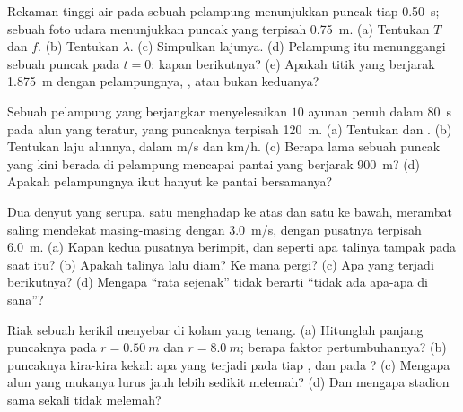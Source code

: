 \begin{exercise}[$\star\star\star$]\label{exo:g12:mechanical-waves:12}
Rekaman tinggi air pada sebuah pelampung menunjukkan puncak tiap
\qty{0.50}{s}; sebuah foto udara menunjukkan puncak yang terpisah
\qty{0.75}{m}. (a) Tentukan $T$ dan $f$. (b) Tentukan $\lambda$.
(c) Simpulkan lajunya. (d) Pelampung itu menunggangi sebuah puncak pada
$t = 0$: kapan berikutnya? (e) Apakah titik yang berjarak \qty{1.875}{m}
 dengan pelampungnya, , atau bukan keduanya?
\end{exercise}

\begin{exercise}[$\star\star\star$]\label{exo:g12:mechanical-waves:13}
Sebuah pelampung yang berjangkar menyelesaikan $10$ ayunan penuh dalam
\qty{80}{s} pada alun yang teratur, yang puncaknya terpisah \qty{120}{m}.
(a) Tentukan  dan . (b) Tentukan laju alunnya, dalam
\unit{m/s} dan \unit{km/h}. (c) Berapa lama sebuah puncak yang kini
berada di pelampung mencapai pantai yang berjarak \qty{900}{m}?
(d) Apakah pelampungnya ikut hanyut ke pantai bersamanya?
\end{exercise}

\begin{exercise}[$\star\star\star$]\label{exo:g12:mechanical-waves:14}
Dua denyut yang serupa, satu menghadap ke atas dan satu ke bawah,
merambat saling mendekat masing-masing dengan \qty{3.0}{m/s}, dengan
pusatnya terpisah \qty{6.0}{m}. (a) Kapan kedua pusatnya berimpit, dan
seperti apa talinya tampak pada saat itu? (b) Apakah talinya lalu diam?
Ke mana  pergi? (c) Apa yang terjadi berikutnya? (d) Mengapa
``rata sejenak'' tidak berarti ``tidak ada apa-apa di sana''?
\end{exercise}

\begin{exercise}[$\star\star\star$]\label{exo:g12:mechanical-waves:15}
Riak sebuah kerikil menyebar di kolam yang tenang. (a) Hitunglah panjang
puncaknya pada $r = \qty{0.50}{m}$ dan $r = \qty{8.0}{m}$; berapa faktor
pertumbuhannya? (b)  puncaknya kira-kira kekal: apa yang terjadi
pada  tiap , dan pada ? (c) Mengapa alun yang
mukanya lurus jauh lebih sedikit melemah? (d) Dan mengapa 
stadion sama sekali tidak melemah?
\end{exercise}

